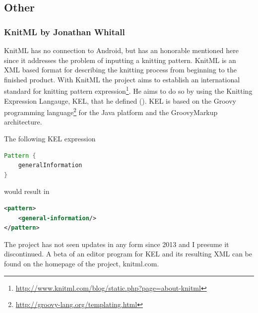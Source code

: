 \subsection{Other}

\subsubsection*{KnitML by Jonathan Whitall}
KnitML has no connection to Android, but has an honorable mentioned here since it addresses the problem of inputting a knitting pattern. KnitML is an XML based format for describing the knitting process from beginning to the finished product. With KnitML the project aims to establish an international standard for knitting pattern expression\footnote{\url{http://www.knitml.com/blog/static.php?page=about-knitml}}. He aims to do so by using the Knitting Expression Langauge, KEL, that he defined (\cite{knitml}). KEL is based on the Groovy programming language\footnote{\url{http://groovy-lang.org/templating.html}} for the Java platform and the GroovyMarkup architecture.

The following KEL expression

\begin{lstlisting}[language=Java, caption=Example expression in KnitML]
Pattern {
    generalInformation
}
\end{lstlisting}

would result in

\begin{lstlisting}[language=XML, caption=Example expression in KnitM: XML result]
<pattern>
    <general-information/>
</pattern>
\end{lstlisting}

The project has not seen updates in any form since 2013 and I presume it discontinued. A beta of an editor program for KEL and its resulting XML can be found on the homepage of the project, knitml.com.